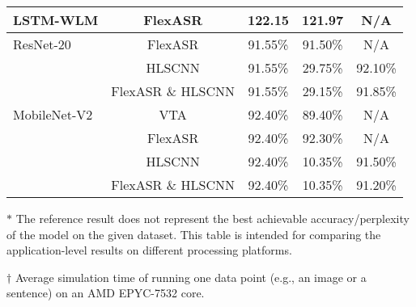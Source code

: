 \begin{table*}
\begin{tabular}{|l|c|c|c|c|}
  LSTM-WLM & 
    FlexASR & 
    122.15 & 
    121.97 & 
    N/A \\
    \hline


  ResNet-20 & 
    FlexASR &
    91.55\% &
    91.50\% &
    N/A  \\
    
   &
    HLSCNN &
    91.55\% &
    \cellcolor[HTML]{E9CECE}29.75\% &
    \cellcolor[HTML]{DDEFDE}92.10\%  \\
    
   &
    FlexASR \& HLSCNN & 
    91.55\% & 
    \cellcolor[HTML]{E9CECE}29.15\% & 
    \cellcolor[HTML]{DDEFDE}91.85\% \\
    \hline

  MobileNet-V2 &
    VTA &
    92.40\% &
    89.40\% &
    N/A \\
  
   &
    FlexASR &
    92.40\% &
    92.30\% &
    N/A \\

   & 
    HLSCNN & 
    92.40\% & 
    \cellcolor[HTML]{E9CECE}10.35\% & 
    \cellcolor[HTML]{DDEFDE}91.50\% \\
    
   & 
    FlexASR \& HLSCNN & 
    92.40\% & 
    \cellcolor[HTML]{E9CECE}10.35\% & 
    \cellcolor[HTML]{DDEFDE}91.20\% \\


    \hline
  \end{tabular}
  \begin{tablenotes}
    \item $\ast$ The reference result does not represent the best achievable accuracy/perplexity of the model on the given dataset. This table is intended for comparing the application-level results on different processing platforms.
    \item $\dagger$ Average simulation time of running one data point (e.g., an image or a sentence) on an AMD EPYC-7532 core.
  \end{tablenotes}
\end{table*}
